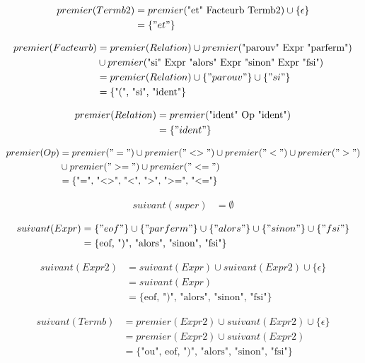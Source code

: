 \documentclass[a4paper,12pt]{article}
\begin{document}
\begin{align*}
premier(Termb2) &= premier(\text{"et" Facteurb Termb2}) \cup \{\epsilon\} \\
        &= \{"et"\}
\end{align*}

\begin{align*}
premier(Facteurb) &= premier(Relation) \cup premier(\text{"parouv" Expr "parferm"}) \\
   & \cup premier(\text{"si" Expr "alors" Expr "sinon" Expr "fsi"}) \\
          &= premier(Relation) \cup \{"parouv"\} \cup \{"si"\} \\
          &= \{\text{"(", "si", "ident"}\}
\end{align*}

\begin{align*}
premier(Relation) &= premier(\text{"ident" Op "ident"}) \\
          &= \{"ident"\}
\end{align*}

\begin{align*}
premier(Op)   &= premier("=") \cup premier("<>") \cup premier("<") \cup premier(">") \\
    & \cup premier(">=") \cup premier("<=") \\
        &= \{\text{"=", "<>", "<", ">", ">=", "<="}\}
\end{align*}

\begin{align*}
suivant(super) &= \emptyset
\end{align*}

\begin{align*}
suivant(Expr) &= \{"eof"\} \cup \{"parferm"\} \cup \{"alors"\} \cup \{"sinon"\} \cup \{"fsi"\} \\
        &= \{\text{eof, ")", "alors", "sinon", "fsi"}\}
\end{align*}

\begin{align*}
suivant(Expr2)  &= suivant(Expr) \cup suivant(Expr2) \cup \{\epsilon\} \\
        &= suivant(Expr) \\
        &= \{\text{eof, ")", "alors", "sinon", "fsi"}\}
\end{align*}

\begin{align*}
suivant(Termb)  &= premier(Expr2) \cup suivant(Expr2) \cup \{\epsilon\} \\
        &= premier(Expr2) \cup suivant(Expr2) \\
        &= \{\text{"ou", eof, ")", "alors", "sinon", "fsi"}\}
\end{align*}
\end{document}
